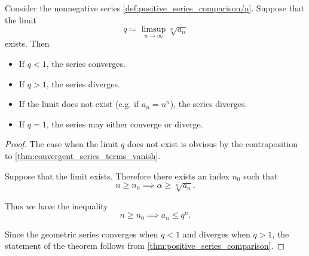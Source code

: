 \begin{proposition}\label{thm:cauchys_root_test}\cite[theorem 3.33]{Rudin1991}
  Consider the nonnegative series \cref{def:positive_series_comparison/a}. Suppose that the limit
  \begin{equation*}
    q \coloneqq \limsup_{n \to \infty} \sqrt[n]{a_n}
  \end{equation*}
  exists. Then
  \begin{itemize}
    \item If \( q < 1 \), the series converges.
    \item If \( q > 1 \), the series diverges.
    \item If the limit does not exist (e.g. if \( a_n = n^n \)), the series diverges.
    \item If \( q = 1 \), the series may either converge or diverge.
  \end{itemize}
\end{proposition}
\begin{proof}
  The case when the limit \( q \) does not exist is obvious by the contraposition to \cref{thm:convergent_series_terms_vanish}.

  Suppose that the limit exists. Therefore there exists an index \( n_0 \) such that
  \begin{equation*}
    n \geq n_0 \implies \alpha \geq \sqrt[n]{a_n}.
  \end{equation*}

  Thus we have the inequality
  \begin{equation*}
    n \geq n_0 \implies a_n \leq q^n.
  \end{equation*}

  Since the geometric series converges when \( q < 1 \) and diverges when \( q > 1 \), the statement of the theorem follows from \cref{thm:positive_series_comparison}.
\end{proof}
